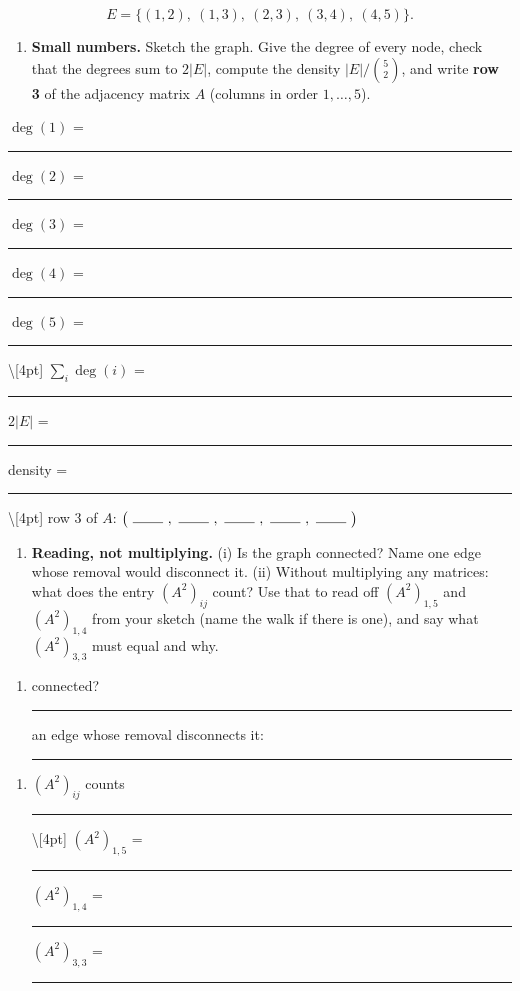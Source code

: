 \documentclass[
  11pt,
]{article}
\providecommand{\tightlist}{%
  \setlength{\itemsep}{0pt}\setlength{\parskip}{0pt}}
\newcommand{\answerspace}[1]{\par\vspace*{#1}}  %
\newcommand{\blank}[1][1.2in]{\rule{#1}{0.4pt}}
\begin{document}
\[
E = \{(1,2),\ (1,3),\ (2,3),\ (3,4),\ (4,5)\}.
\]

\begin{enumerate}
\def\labelenumi{(\alph{enumi})}
\tightlist
\item
  \textbf{Small numbers.} Sketch the graph. Give the degree of every
  node, check that the degrees sum to \(2|E|\), compute the density
  \(|E|/\binom{5}{2}\), and write \textbf{row 3} of the adjacency matrix
  \(A\) (columns in order \(1,\dots,5\)).
\end{enumerate}

\(\deg(1)\) = \blank[0.5in]\quad \(\deg(2)\) =
\blank[0.5in]\quad \(\deg(3)\) = \blank[0.5in]\quad \(\deg(4)\) =
\blank[0.5in]\quad \(\deg(5)\) = \blank[0.5in]\textbackslash{[}4pt{]}
\(\sum_i \deg(i)\) = \blank[0.6in]\qquad \(2|E|\) =
\blank[0.6in]\qquad density = \blank[0.8in]\textbackslash{[}4pt{]} row 3
of \(A\):
\(\big(\ \blank[0.3in]\ ,\ \blank[0.3in]\ ,\ \blank[0.3in]\ ,\ \blank[0.3in]\ ,\ \blank[0.3in]\ \big)\)

\answerspace{2.2in}

\begin{enumerate}
\def\labelenumi{(\alph{enumi})}
\setcounter{enumi}{1}
\tightlist
\item
  \textbf{Reading, not multiplying.} (i) Is the graph connected? Name
  one edge whose removal would disconnect it. (ii) Without multiplying
  any matrices: what does the entry \((A^2)_{ij}\) count? Use that to
  read off \((A^2)_{1,5}\) and \((A^2)_{1,4}\) from your sketch (name
  the walk if there is one), and say what \((A^2)_{3,3}\) must equal and
  why.
\end{enumerate}

\begin{enumerate}
\def\labelenumi{(\roman{enumi})}
\tightlist
\item
  connected? \blank[0.6in]\qquad an edge whose removal disconnects it:
  \blank[0.8in]
\end{enumerate}

\answerspace{0.5in}

\begin{enumerate}
\def\labelenumi{(\roman{enumi})}
\setcounter{enumi}{1}
\tightlist
\item
  \((A^2)_{ij}\) counts \blank[2.4in]\textbackslash{[}4pt{]}
  \((A^2)_{1,5}\) = \blank[0.5in]\qquad \((A^2)_{1,4}\) =
  \blank[0.5in]\qquad \((A^2)_{3,3}\) = \blank[0.5in]
\end{enumerate}

\answerspace{1.4in}
\end{document}
